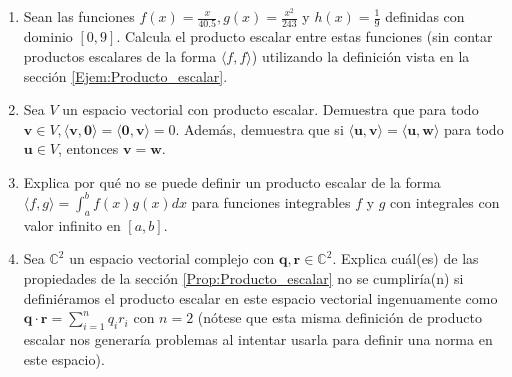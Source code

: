 \documentclass[notasLineal]{subfile}
\begin{document}
\begin{enumerate}
    \item Sean las funciones $f(x)=\frac{x}{40.5}, g(x)=\frac{x^2}{243}$ y $h(x)=\frac{1}{9}$ definidas con dominio $[0,9]$. Calcula el producto escalar entre estas funciones (sin contar productos escalares de la forma $\langle f , f \rangle$) utilizando la definición vista en la sección \ref{Ejem:Producto_escalar}.
    \item Sea $V$ un espacio vectorial con producto escalar. Demuestra que para todo $\mathbf{v}\in V, \langle \mathbf{v},\mathbf{0}\rangle=\langle\mathbf{0},\mathbf{v}\rangle=0.$ Además, demuestra que si $\langle\mathbf{u},\mathbf{v}\rangle=\langle \mathbf{u},\mathbf{w}\rangle$ para todo $\mathbf{u}\in V$, entonces $\mathbf{v}=\mathbf{w}.$
    \item Explica por qué no se puede definir un producto escalar de la forma $\langle f,g\rangle=\int_a^b f(x)g(x)dx$ para funciones integrables $f$ y $g$ con integrales con valor infinito en $[a,b]$. 
    \item Sea $\mathbb{C}^2$ un espacio vectorial complejo con $\mathbf{q},\mathbf{r}\in\mathbb{C}^2$. Explica cuál(es) de las propiedades de la sección \ref{Prop:Producto_escalar} no se cumpliría(n) si definiéramos el producto escalar en este espacio vectorial ingenuamente como $\mathbf{q}\cdot\mathbf{r}=\sum_{i=1}^n q_ir_i$  con $n=2$ (nótese que esta misma definición de producto escalar nos generaría problemas al intentar usarla para definir una norma en este espacio). 
\end{enumerate}
\end{document}
